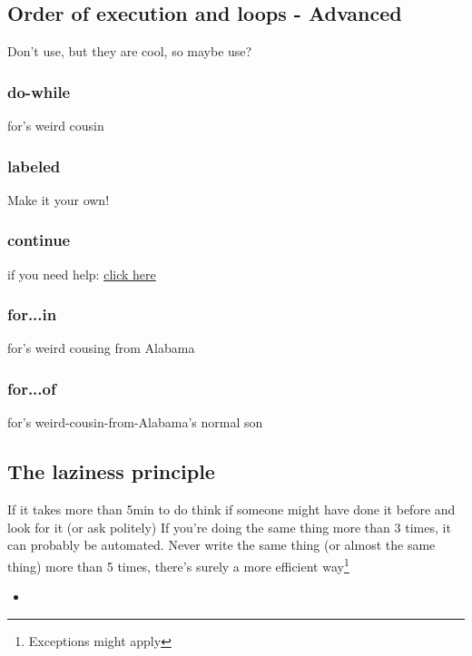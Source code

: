 \subsection{Order of execution and loops - Advanced}
\label{sub:execAdv}
Don't use, but they are cool, so maybe use?
    \subsubsection{do-while}
    \label{subsub:doWhile}
for's weird cousin

    \subsubsection{labeled}
    \label{subsub:labeled}
Make it your own!

    \subsubsection{continue}
    \label{subsub:continue}
if you need help: \href{http://letmegooglethat.com/?q=continue}{click here}

    \subsubsection{for...in}
    \label{subsub:forIn}
for's weird cousing from Alabama

    \subsubsection{for...of}
    \label{subsub:forOf}
for's weird-cousin-from-Alabama's normal son
    
\subsection{The laziness principle}
\label{sub:lazy}
If it takes more than 5min to do think if someone might have done it before and look for it (or ask politely)
If you're doing the same thing more than 3 times, it can probably be automated. Never write the same thing (or almost the same thing) more than 5 times, there's surely a more efficient way\footnote{Exceptions might apply}

\begin{itemize}
    \item
\end{itemize}
